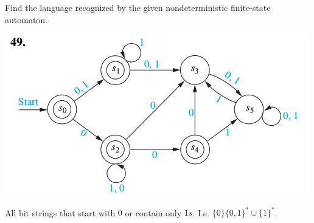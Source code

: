 \documentclass[../main.tex]{subfiles}
\begin{document}
Find the language recognized by the given nondeterministic finite-state automaton.

\includegraphics[width=\textwidth]{img/Q13_3_49}
\solution

All bit strings that start with $0$ or contain only $1s$. I.e. $\{0\}\{0,1\}^\ast \cup \{1\}^\ast$. 
\end{document}
